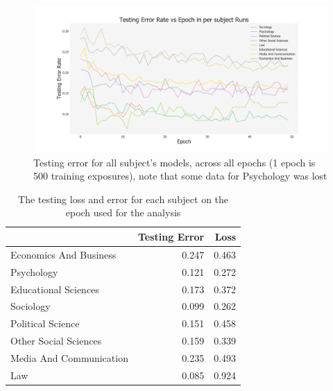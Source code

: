\documentclass[12pt, a4paper]{article}
\begin{document}
\begin{figure}[ht]
	\centering
	\begin{adjustbox}{center}
		\includegraphics[width=1.3\textwidth]{err_mixed}
	\end{adjustbox}
	\caption{Testing error for all subject's models, across all epochs (1 epoch is 500 training exposures), note that some data for Psychology was lost}\label{err}
\end{figure}

\begin{table}[ht]
	\centering
	\begin{adjustbox}{center}
		\begin{tabular}{lrr}
			\toprule
			{} &  Testing Error &   Loss \\
			\midrule
			Economics And Business  &         \num{0.247} & \num{0.463} \\
			Psychology              &         \num{0.121} & \num{0.272} \\
			Educational Sciences    &         \num{0.173} & \num{0.372} \\
			Sociology               &         \num{0.099} & \num{0.262} \\
			Political Science       &         \num{0.151} & \num{0.458} \\
			Other Social Sciences   &         \num{0.159} & \num{0.339} \\
			Media And Communication &         \num{0.235} & \num{0.493} \\
			Law                     &         \num{0.085} & \num{0.924} \\
			\bottomrule
		\end{tabular}
	\end{adjustbox}
	\caption{The testing loss and error for each subject on the epoch used for the analysis}\label{final_loss}
\end{table}
\end{document}
